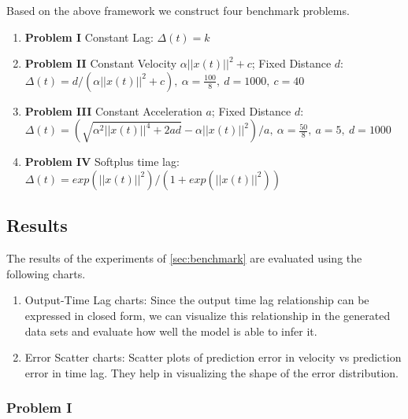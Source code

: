 \documentclass[envcountsect,runningheads]{llncs}
\theoremstyle{etoile}
\begin{document}
Based on the above framework we construct four benchmark problems.

\begin{enumerate}
\item \textbf{Problem I} Constant Lag: \newline 
$\Delta(t) = k$

\item \textbf{Problem II} Constant Velocity $\alpha ||x(t)||^2 + c$; Fixed Distance $d$: 
\newline $\Delta(t) = d/(\alpha ||x(t)||^2 + c),\ \alpha = \frac{100}{8},\ d = 1000,\ c = 40$

\item \textbf{Problem III} Constant Acceleration $a$; Fixed Distance $d$: 
\newline $\Delta(t) = (\sqrt{\alpha^2||x(t)||^4 + 2ad} - \alpha||x(t)||^2)/a,\ \alpha = \frac{50}{8},\ a = 5,\ d = 1000$

\item \textbf{Problem IV} Softplus time lag: 
\newline $\Delta(t) = exp\left(||x(t)||^2\right)/\left(1 + exp(||x(t)||^2)\right)$

\end{enumerate}



\subsection{Results}

The results of the experiments of \ref{sec:benchmark} are evaluated using the following charts.

\begin{enumerate}
    \item Output-Time Lag charts: Since the output time lag relationship can be expressed in closed 
          form, we can visualize this relationship in the generated data sets and evaluate how well 
          the model is able to infer it.
    \item Error Scatter charts: Scatter plots of prediction error in velocity vs prediction error 
          in time lag. They help in visualizing the shape of the error distribution.
\end{enumerate}


\subsubsection{Problem I}
\end{document}
